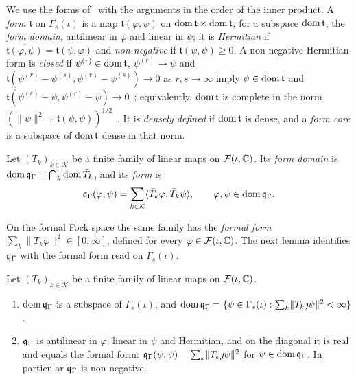 \begin{vetbenv}
We use the forms of~\cite[VI\,\S1]{kato} with the arguments in the order of the inner product. A
\emph{form} $\mathfrak t$ on $\Gamma_s(\iota)$ is a map $\mathfrak t(\varphi,\psi)$ on $\operatorname{dom}\mathfrak t\times
\operatorname{dom}\mathfrak t$, for a subspace $\operatorname{dom}\mathfrak t$, the \emph{form domain}, antilinear in $\varphi$ and
linear in $\psi$; it is \emph{Hermitian} if $\overline{\mathfrak t(\varphi,\psi)}=\mathfrak t(\psi,\varphi)$
and \emph{non-negative} if $\mathfrak t(\psi,\psi)\ge0$. A non-negative Hermitian form is \emph{closed}
if $\psi^{(r)}\in\operatorname{dom}\mathfrak t$, $\psi^{(r)}\to\psi$ and $\mathfrak t(\psi^{(r)}-\psi^{(s)},\psi^{(r)}-
\psi^{(s)})\to0$ as $r,s\to\infty$ imply $\psi\in\operatorname{dom}\mathfrak t$ and $\mathfrak t(\psi^{(r)}-\psi,
\psi^{(r)}-\psi)\to0$~\cite[VI\,\S1.3]{kato}; equivalently, $\operatorname{dom}\mathfrak t$ is complete in the norm
$(\lVert\psi\rVert^2+\mathfrak t(\psi,\psi))^{1/2}$~\cite[VI, Theorem~1.11]{kato}. It is \emph{densely
defined} if $\operatorname{dom}\mathfrak t$ is dense, and a \emph{form core} is a subspace of $\operatorname{dom}\mathfrak t$ dense in
that norm.

\begin{definition}\label{def:fock-form}
Let $(T_k)_{k\in\mathcal K}$ be a finite family of linear maps on $\mathcal F(\iota,\mathbb C)$. Its \emph{form
domain} is $\operatorname{dom}\mathfrak q_\Gamma=\bigcap_k\operatorname{dom}\bar T_k$, and its \emph{form} is
\[
 \mathfrak q_\Gamma(\varphi,\psi)=\sum_{k\in\mathcal K}\langle\bar T_k\varphi,\bar T_k\psi\rangle,\qquad
 \varphi,\psi\in\operatorname{dom}\mathfrak q_\Gamma .
\]
\end{definition}

On the formal Fock space the same family has the \emph{formal form} $\sum_k\lVert T_k\varphi\rVert^2\in
[0,\infty]$, defined for every $\varphi\in\mathcal F(\iota,\mathbb C)$. The next lemma identifies $\mathfrak q_\Gamma$ with
the formal form read on $\Gamma_s(\iota)$.

\begin{lemma}\label{lem:fock-form}
Let $(T_k)_{k\in\mathcal K}$ be a finite family of linear maps on $\mathcal F(\iota,\mathbb C)$.
\begin{enumerate}
\item[(a)] $\operatorname{dom}\mathfrak q_\Gamma$ is a subspace of $\Gamma_s(\iota)$, and $\operatorname{dom}\mathfrak q_\Gamma=\{\psi\in
\Gamma_s(\iota):\sum_k\lVert T_k\jmath\psi\rVert^2<\infty\}$.
\item[(b)] $\mathfrak q_\Gamma$ is antilinear in $\varphi$, linear in $\psi$ and Hermitian, and on the diagonal
it is real and equals the formal form: $\mathfrak q_\Gamma(\psi,\psi)=\sum_k\lVert T_k\jmath\psi\rVert^2$ for
$\psi\in\operatorname{dom}\mathfrak q_\Gamma$. In particular $\mathfrak q_\Gamma$ is non-negative.
\end{enumerate}
\end{lemma}


\end{vetbenv}
